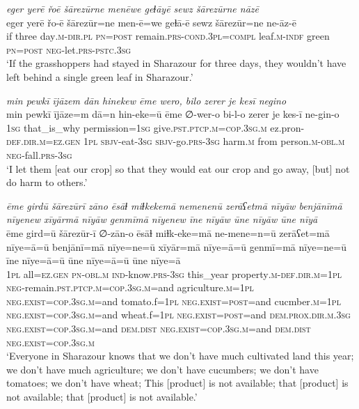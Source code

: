 \ea \label{PM.35}
\textit{eger yerē řoē šārezūrne menēwe geɫāyē sewz šārezūrne nāzē} \\ 
\gll eger yerē řo-ē šārezūr=ne men-ē=we geɫā-ē sewz šārezūr=ne ne-āz-ē \\ 
 if three day\textsc{.m}\textsc{-dir}\textsc{.pl} \textsc{pn}\textsc{=\textsc{post}} remain\textsc{.prs}\textsc{-cond}\textsc{.3pl}\textsc{=compl} leaf\textsc{.m}\textsc{-indf} green \textsc{pn}\textsc{=\textsc{post}} \textsc{neg-}let\textsc{.prs}\textsc{-pstc}\textsc{.3sg} \\ 
\glt `If the grasshoppers had stayed in Sharazour for three days, they wouldn’t have left behind a single green leaf in Sharazour.'
\z 
 
\ea \label{PM.36}
\textit{min pewkī ījāzem dān hinekew ēme wero, bilo zerer je kesī negino} \\ 
\gll min pewkī ījāze=m dā=n hin-eke=ū ēme ∅-wer-o bi-l-o zerer je kes-ī ne-gin-o \\ 
 \textsc{1sg} that\_is\_why permission\textsc{=\textsc{1sg}} give\textsc{.pst}\textsc{.ptcp}\textsc{.m}\textsc{=cop}\textsc{.3sg}\textsc{.m} ez.pron\textsc{-def}\textsc{.dir}\textsc{.m}\textsc{\textsc{=ez.gen}} \textsc{1pl} \textsc{sbjv-}eat\textsc{-3sg} \textsc{sbjv-}go\textsc{.prs}\textsc{-3sg} harm\textsc{.m} from person\textsc{.m}\textsc{-obl}\textsc{.m} \textsc{neg-}fall\textsc{.prs}\textsc{-3sg} \\ 
\glt `I let them [eat our crop] so that they would eat our crop and go away, [but] not do harm to others.'
\z 
 
\ea \label{PM.37}
\textit{ēme girdū šārezūrī zāno ēsāɫ miɫkekemā nemenenū zerāʕetmā nīyāw benjānīmā nīyenew xīyārmā nīyāw genmīmā nīyenew īne nīyāw ūne nīyāw ūne nīyā} \\ 
\gll ēme gird=ū šārezūr-ī ∅-zān-o ēsāɫ miɫk-eke=mā ne-mene=n=ū zerāʕet=mā nīye=ā=ū benjānī=mā nīye=ne=ū xīyār=mā nīye=ā=ū genmī=mā nīye=ne=ū īne nīye=ā=ū ūne nīye=ā=ū ūne nīye=ā \\ 
 \textsc{1pl} all\textsc{\textsc{=ez.gen}} \textsc{pn}\textsc{-obl}\textsc{.m} \textsc{ind-}know\textsc{.prs}\textsc{-3sg} this\_year property\textsc{.m}\textsc{-def}\textsc{.dir}\textsc{.m}\textsc{=1pl} \textsc{neg-}remain\textsc{.pst}\textsc{.ptcp}\textsc{.m}\textsc{=cop}\textsc{.3sg}\textsc{.m}=and agriculture\textsc{.m}\textsc{=1pl} \textsc{\textsc{neg.}exist}\textsc{=cop}\textsc{.3sg}\textsc{.m}=and tomato.f\textsc{=1pl} \textsc{\textsc{neg.}exist}\textsc{=\textsc{post}}=and cucmber\textsc{.m}\textsc{=1pl} \textsc{\textsc{neg.}exist}\textsc{=cop}\textsc{.3sg}\textsc{.m}=and wheat.f\textsc{=1pl} \textsc{\textsc{neg.}exist}\textsc{=\textsc{post}}=and \textsc{dem.prox}\textsc{.dir}\textsc{.m}\textsc{.3sg} \textsc{\textsc{neg.}exist}\textsc{=cop}\textsc{.3sg}\textsc{.m}=and \textsc{dem.dist} \textsc{\textsc{neg.}exist}\textsc{=cop}\textsc{.3sg}\textsc{.m}=and \textsc{dem.dist} \textsc{\textsc{neg.}exist}\textsc{=cop}\textsc{.3sg}\textsc{.m} \\ 
\glt `Everyone in Sharazour knows that we don’t have much cultivated land this year; we don’t have much agriculture; we don’t have cucumbers; we don’t have tomatoes; we don’t have wheat; This [product] is not available; that [product] is not available; that [product] is not available.'
\z 
 
